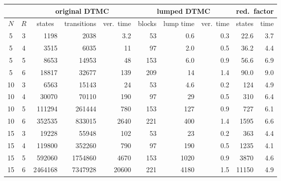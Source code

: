 \documentclass{llncs}
\begin{document}
{\scriptsize
\begin{center}
\begin{tabular}{|c|c|r|r|r|r|r|r|r|r|}
\hline 
\multicolumn{2}{|c}{} & \multicolumn{3}{c|}{original DTMC} & \multicolumn{3}{c|}{lumped DTMC} 
  & \multicolumn{2}{c|}{red.\ factor} \\[1ex] \hline 
     $N$    &$R$& \multicolumn{1}{c|}{states} &transitions& ver.\ time    &blocks& lump time     &ver.\ time& \multicolumn{1}{c|}{states} & time \\ \hline
\phantom{0}5& 3 &    1198 &    2038 &     3.2          &  53 &    0.6          & 0.3 &   22.6          & 3.7 \\
\phantom{0}5& 4 &    3515 &    6035 &    11\phantom{.0}&  97 &    2.0          & 0.5 &   36.2          & 4.4 \\
\phantom{0}5& 5 &    8653 &   14953 &    48\phantom{.0}& 153 &    6.0          & 0.9 &   56.6          & 6.9 \\
\phantom{0}5& 6 &   18817 &   32677 &   139\phantom{.0}& 209 &   14\phantom{.0}& 1.4 &   90.0          & 9.0 \\ \hline 
         10 & 3 &    6563 &   15143 &    24\phantom{.0}&  53 &    4.6          & 0.2 &  124\phantom{.0}& 4.9 \\
         10 & 4 &   30070 &   70110 &   190\phantom{.0}&  97 &   29\phantom{.0}& 0.5 &  310\phantom{.0}& 6.4 \\
         10 & 5 &  111294 &  261444 &   780\phantom{.0}& 153 &  127\phantom{.0}& 0.9 &  727\phantom{.0}& 6.1 \\
         10 & 6 &  352535 &  833015 &  2640\phantom{.0}& 221 &  400\phantom{.0}& 1.4 & 1595\phantom{.0}& 6.6 \\ \hline 
         15 & 3 &   19228 &   55948 &   102\phantom{.0}&  53 &   23\phantom{.0}& 0.2 &   363\phantom{.0}& 4.4 \\
         15 & 4 &  119800 &  352260 &   790\phantom{.0}&  97 &  190\phantom{.0}& 0.5 &  1235\phantom{.0}& 4.1 \\
         15 & 5 &  592060 & 1754860 &  4670\phantom{.0}& 153 & 1020\phantom{.0}& 0.9 &  3870\phantom{.0}& 4.6 \\
         15 & 6 & 2464168 & 7347928 & 20600\phantom{.0}& 221 & 4180\phantom{.0}& 1.5 & 11150\phantom{.0}& 4.9 \\ \hline 
\end{tabular}
\end{center}
}
\end{document}
